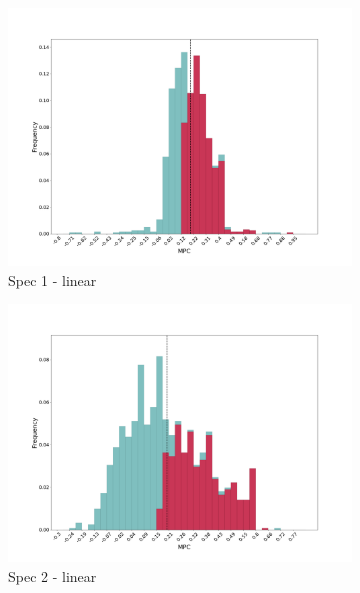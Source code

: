 \begin{figure}[t]
    \centering
    \begin{subfigure}{0.33\linewidth}
        \includegraphics[width=\linewidth]{figures/distributions/spec1_lin_chNDexp.png}
        \caption{Spec 1 - linear}
    \end{subfigure}\hfill
    \begin{subfigure}{0.33\linewidth}
        \includegraphics[width=\linewidth]{figures/distributions/spec2_lin_chNDexp.png}
        \caption{Spec 2 - linear}
    \end{subfigure}\hfill
    \begin{subfigure}{0.33\linewidth}

\end{subfigure}
\end{figure}
